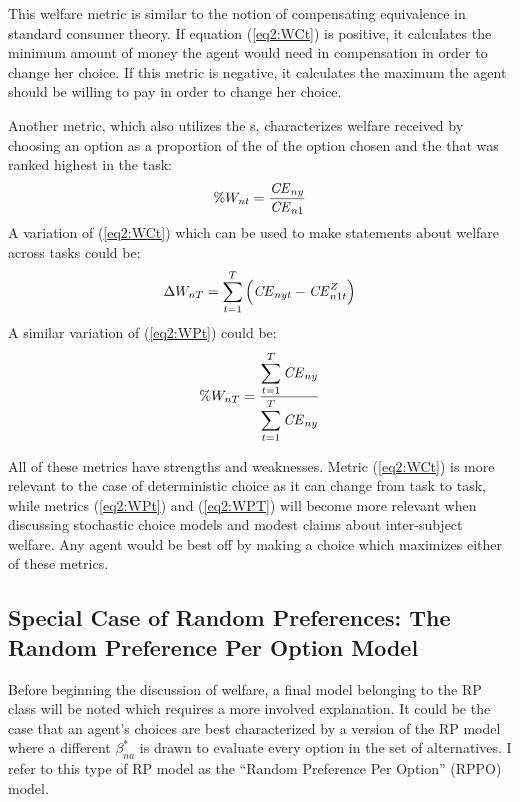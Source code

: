 \documentclass[../main.tex]{subfiles}
\begin{document}
This welfare metric is similar to the notion of compensating equivalence in standard consumer theory.
If equation (\ref{eq2:WCt}) is positive, it calculates the minimum amount of money the agent would need in compensation in order to change her choice.
If this metric is negative, it calculates the maximum the agent should be willing to pay in order to change her choice.

Another metric, which also utilizes the {\CE}s, characterizes welfare received by choosing an option as a proportion of the {\CE} of the option chosen and the {\CE} that was ranked highest in the task:
\begin{equation}
	\label{eq2:WPt}
	\%W_{nt} = \frac{ {\mathit{CE}}_{ny} }{ {\mathit{CE}}_{n1} }
\end{equation}
\noindent A variation of (\ref{eq2:WCt}) which can be used to make statements about welfare across tasks could be:
\begin{equation}
	\label{eq2:WCT}
	\Delta W_{nT} = \sum_{t=1}^T \left( {\mathit{CE}}_{nyt} - {\mathit{CE}}_{n1t}^Z \right)
\end{equation}
\noindent A similar variation of (\ref{eq2:WPt}) could be:
\begin{equation}
	\label{eq2:WPT}
	\%W_{nT} = \frac{\displaystyle\sum_{t=1}^{T} {\mathit{CE}}_{ny} }{\displaystyle\sum_{t=1}^{T} {\mathit{CE}}_{ny}}
\end{equation}

All of these metrics have strengths and weaknesses.
Metric (\ref{eq2:WCt}) is more relevant to the case of deterministic choice as it can change from task to task, while metrics (\ref{eq2:WPt}) and (\ref{eq2:WPT}) will become more relevant when discussing stochastic choice models and modest claims about inter-subject welfare.
Any agent would be best off by making a choice which maximizes either of these metrics.

\singlespacing
\subsection{Special Case of Random Preferences: The Random Preference Per Option Model}
\doublespacing

Before beginning the discussion of welfare, a final model belonging to the RP class will be noted which requires a more involved explanation.
It could be the case that an agent's choices are best characterized by a version of the RP model where a different $\beta^*_{na}$ is drawn to evaluate every option in the set of alternatives.
I refer to this type of RP model as the \enquote{Random Preference Per Option} (RPPO) model.
\end{document}
